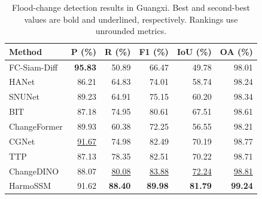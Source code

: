 \begingroup
\begin{table}[H]
\centering
\comparisonfont
\captionsetup{name=Table,font=comparisoncaption,labelfont=bf,labelsep=newline,justification=raggedright,singlelinecheck=false}
\caption{Flood-change detection results in Guangxi. Best and second-best values are bold and underlined, respectively. Rankings use unrounded metrics.}
\label{tab:comparison_guangxi}
\fontsize{10}{12}\selectfont
\setlength{\tabcolsep}{6pt}
\renewcommand{\arraystretch}{1.15}
\begin{tabular*}{\linewidth}{@{\extracolsep{\fill}}lrrrrr@{}}
\toprule
Method & P (\%) & R (\%) & F1 (\%) & IoU (\%) & OA (\%) \\
\midrule
FC-Siam-Diff & \textbf{95.83} & 50.89 & 66.47 & 49.78 & 98.01 \\
HANet & 86.21 & 64.83 & 74.01 & 58.74 & 98.24 \\
SNUNet & 89.23 & 64.91 & 75.15 & 60.20 & 98.34 \\
BIT & 87.18 & 74.95 & 80.61 & 67.51 & 98.61 \\
ChangeFormer & 89.93 & 60.38 & 72.25 & 56.55 & 98.21 \\
CGNet & \underline{91.67} & 74.98 & 82.49 & 70.19 & 98.77 \\
TTP & 87.13 & 78.35 & 82.51 & 70.22 & 98.71 \\
ChangeDINO & 88.07 & \underline{80.08} & \underline{83.88} & \underline{72.24} & \underline{98.81} \\
HarmoSSM & 91.62 & \textbf{88.40} & \textbf{89.98} & \textbf{81.79} & \textbf{99.24} \\
\bottomrule
\end{tabular*}
\end{table}
\endgroup
